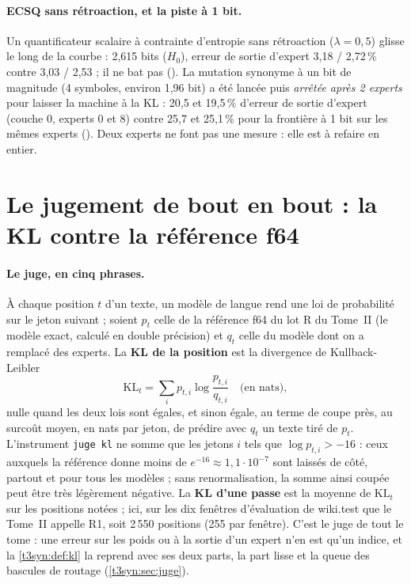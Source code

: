 \paragraph{ECSQ sans rétroaction, et la piste à 1 bit.} Un quantificateur scalaire à contrainte d'entropie sans rétroaction ($\lambda = 0{,}5$) glisse le long de la courbe : 2,615 bits ($H_0$), erreur de sortie d'expert 3,18 / 2,72\,\% contre 3,03 / 2,53 ; il ne bat pas (). La mutation synonyme à un bit de magnitude (4 symboles, environ 1,96 bit) a été lancée puis \emph{arrêtée après 2 experts} pour laisser la machine à la KL : 20,5 et 19,5\,\% d'erreur de sortie d'expert (couche 0, experts 0 et 8) contre 25,7 et 25,1\,\% pour la frontière à 1 bit sur les mêmes experts (). Deux experts ne font pas une mesure : elle est à refaire en entier.

\section{Le jugement de bout en bout : la KL contre la référence f64}\label{t3ecl:sec:kl}

\paragraph{Le juge, en cinq phrases.} À chaque position $t$ d'un texte, un modèle de langue rend une loi de probabilité sur le jeton suivant ; soient $p_t$ celle de la référence f64 du lot R du Tome~II (le modèle exact, calculé en double précision) et $q_t$ celle du modèle dont on a remplacé des experts. La \textbf{KL de la position} est la divergence de Kullback-Leibler~\cite{kullback1951}
\begin{equation}\label{t3ecl:eq:kl}
\mathrm{KL}_t = \sum_i p_{t,i} \log \frac{p_{t,i}}{q_{t,i}} \quad \text{(en nats)},
\end{equation}
nulle quand les deux lois sont égales, et sinon égale, au terme de coupe près, au surcoût moyen, en nats par jeton, de prédire avec $q_t$ un texte tiré de $p_t$. L'instrument \texttt{juge kl} ne somme que les jetons $i$ tels que $\log p_{t,i} > -16$ : ceux auxquels la référence donne moins de $e^{-16} \approx 1{,}1\cdot10^{-7}$ \calc{} sont laissés de côté, partout et pour tous les modèles ; sans renormalisation, la somme ainsi coupée peut être très légèrement négative. La \textbf{KL d'une passe} est la moyenne de $\mathrm{KL}_t$ sur les positions notées ; ici, sur les dix fenêtres d'évaluation de wiki.test que le Tome~II appelle R1, soit 2\,550 positions (255 par fenêtre). C'est le juge de tout le tome : une erreur sur les poids ou à la sortie d'un expert n'en est qu'un indice, et la \cref{t3syn:def:kl} la reprend avec ses deux parts, la part lisse et la queue des bascules de routage (\cref{t3syn:sec:juge}).

